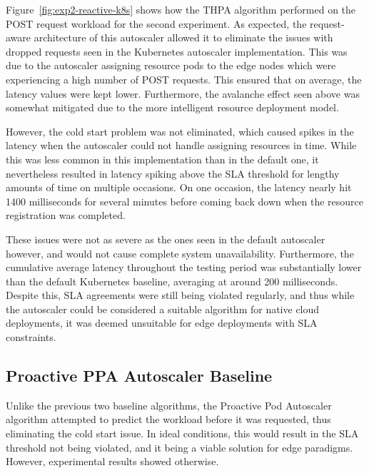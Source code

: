 Figure~\ref{fig:exp2-reactive-k8s} shows how the THPA algorithm performed on the POST request workload for the second experiment. As expected, the request-aware architecture of this autoscaler allowed it to eliminate the issues with dropped requests seen in the Kubernetes autoscaler implementation. This was due to the autoscaler assigning resource pods to the edge nodes which were experiencing a high number of POST requests. This ensured that on average, the latency values were kept lower. Furthermore, the avalanche effect seen above was somewhat mitigated due to the more intelligent resource deployment model.\par

However, the cold start problem was not eliminated, which caused spikes in the latency when the autoscaler could not handle assigning resources in time. While this was less common in this implementation than in the default one, it nevertheless resulted in latency spiking above the SLA threshold for lengthy amounts of time on multiple occasions. On one occasion, the latency nearly hit 1400 milliseconds for several minutes before coming back down when the resource registration was completed.\par

These issues were not as severe as the ones seen in the default autoscaler however, and would not cause complete system unavailability. Furthermore, the cumulative average latency throughout the testing period was substantially lower than the default Kubernetes baseline, averaging at around 200 milliseconds. Despite this, SLA agreements were still being violated regularly, and thus while the autoscaler could be considered a suitable algorithm for native cloud deployments, it was deemed unsuitable for edge deployments with SLA constraints.\par

\subsection {Proactive PPA Autoscaler Baseline}
\label{subsec:ch6-proactive-algo}

Unlike the previous two baseline algorithms, the Proactive Pod Autoscaler algorithm attempted to predict the workload before it was requested, thus eliminating the cold start issue. In ideal conditions, this would result in the SLA threshold not being violated, and it being a viable solution for edge paradigms. However, experimental results showed otherwise.\par

